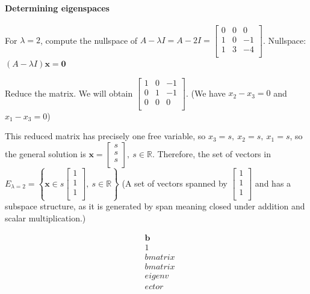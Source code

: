 \documentclass[
]{article}
\begin{document}
\paragraph{Determining eigenspaces}

For $\lambda = 2$, compute the nullspace of
$A - \lambda I = A - 2I = \begin{bmatrix}
0 & 0 & 0 \\
1 & 0 & - 1 \\
1 & 3 & - 4 \\
\end{bmatrix}$. Nullspace:
$(A - \lambda I)\mathbf{x} = \mathbf{0}$

Reduce the matrix. We will obtain $\begin{bmatrix}
1 & 0 & - 1 \\
0 & 1 & - 1 \\
0 & 0 & 0 \\
\end{bmatrix}$. (We have $x_{2} - x_{3} = 0$ and
$x_{1} - x_{3} = 0$)

This reduced matrix has precisely one free variable, so
$x_{3} = s,\ x_{2} = s,\ x_{1} = s$, so the general solution is
$\mathbf{x} = \begin{bmatrix}
s \\
s \\
s \\
\end{bmatrix},\ s\mathbb{\in R}$. Therefore, the set of vectors in
$E_{\lambda = 2} = \left\{ \mathbf{x} \in s\begin{bmatrix}
1 \\
1 \\
1 \\
\end{bmatrix},\ s\mathbb{\in R} \right\}$ (A set of vectors spanned by
$\begin{bmatrix}
1 \\
1 \\
1 \\
\end{bmatrix}$ and has a subspace structure, as it is generated by span
meaning closed under addition and scalar multiplication.)

\begin{align*}
&\mathbf{b} \\
&1 \\
&bmatrix \\
&bmatrix \\
&eigenv \\
&ector
\end{align*}
\end{document}
